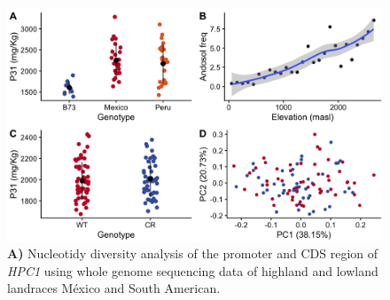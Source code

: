 \documentclass[9pt,twocolumn,twoside,lineno]{BioRxiv}
\begin{document}
\clearpage

\begin{figure}[t]
\begin{center}
\includegraphics[width=0.4\paperwidth]{Sup_Figures/Sup_Fig_6.png}
\caption{\textbf{A)} Nucleotidy diversity analysis of the promoter and CDS region of \textit{HPC1} using whole genome sequencing data of highland and lowland landraces M\'exico and South American.
}
\label{SupFig5}
\end{center}
\end{figure} 

\clearpage


\clearpage
\end{document}
